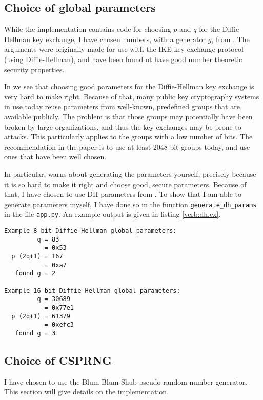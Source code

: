 \documentclass[a4paper,english,12pt]{article}
\begin{document}
\subsection{Choice of global parameters}
While the implementation contains code for choosing $p$ and $q$ for the
Diffie-Hellman key exchange, I have chosen numbers, with a generator $g$, from
\cite{rfc3526}. The arguments were originally made for use with the IKE key
exchange protocol (using Diffie-Hellman), and have been found ot have good
number theoretic security properties.

In \cite{dh.params} we see that choosing good parameters for the Diffie-Hellman
key exchange is very hard to make right. Because of that, many public key
cryptography systems in use today reuse parameters from well-known, predefined
groups that are available publicly. The problem is that those groups may
potentially have been broken by large organizations, and thus the key exchanges
may be prone to attacks. This particularly applies to the groups with a low
number of bits. The recommendation in the paper is to use at least 2048-bit
groups today, and use ones that have been well chosen. 

In particular, \cite{dh.params} warns about generating the parameters yourself,
precisely because it is so hard to make it right and choose good, secure
parameters. Because of that, I have chosen to use DH parameters from
\cite{rfc3526}. To show that I am able to generate parameters myself, I have
done so in the function \texttt{generate\_dh\_params} in the file
\texttt{app.py}. An example output is given in listing \vref{verb:dh.ex}.

\begin{lstlisting}[caption={Finding Diffie-Hellman parameters}, label=verb:dh.ex]
Example 8-bit Diffie-Hellman global parameters:
         q = 83
           = 0x53
  p (2q+1) = 167
           = 0xa7
   found g = 2

Example 16-bit Diffie-Hellman global parameters:
         q = 30689
           = 0x77e1
  p (2q+1) = 61379
           = 0xefc3
   found g = 3
\end{lstlisting}

\subsection{Choice of CSPRNG}
I have chosen to use the Blum Blum Shub \cite{bbs} pseudo-random number
generator. This section will give details on the implementation.
\end{document}
